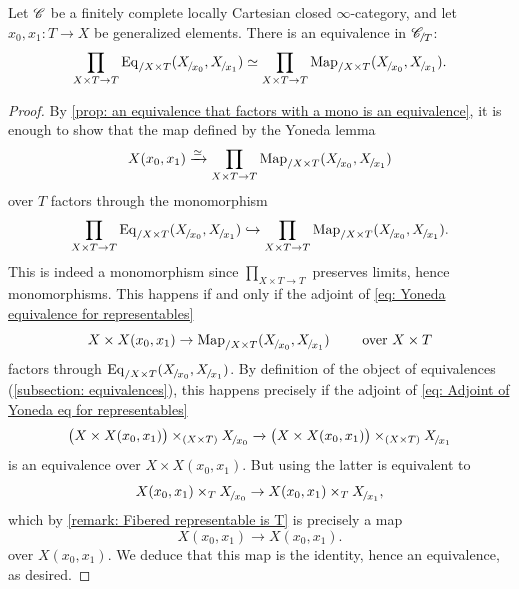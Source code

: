 \documentclass[twoside,a4paper,11pt]{amsart}
\begin{document}
\begin{lemma}\label{lemma: nat trans between representables are nat equivalences}
    Let $\mathscr{C}$ be a finitely complete locally Cartesian closed $\infty$-category, and let $x_0,x_1\colon T\to X$ be generalized elements. There is an equivalence in $\slice{\C}{T}$: \[\prod_{X\times T\to T}\Eq_{/X\times T}(\slice{X}{x_0},\slice{X}{x_1})\simeq \prod_{X\times T\to T}\Map_{/X\times T}(\slice{X}{x_0},\slice{X}{x_1}).\]
\end{lemma}
\begin{proof}
By \cref{prop: an equivalence that factors with a mono is an equivalence}, it is enough to show that the map defined by the Yoneda lemma
\begin{equation}\label{eq: Yoneda equivalence for representables}
X(x_0,x_1)\xrightarrow{\simeq} \prod_{X\times T\to T}\Map_{/X\times T}(\slice{X}{x_0},\slice{X}{x_1})
\end{equation}
over $T$ factors through the monomorphism \[\prod_{X\times T\to T}\Eq_{/X\times T}(\slice{X}{x_0},\slice{X}{x_1})\hookrightarrow \prod_{X\times T\to T}\Map_{/X\times T}(\slice{X}{x_0},\slice{X}{x_1}).\]
This is indeed a monomorphism since $\prod_{X\times T\to T}$ preserves limits, hence monomorphisms.
This happens if and only if the adjoint of \eqref{eq: Yoneda equivalence for representables}
\begin{equation}\label{eq: Adjoint of Yoneda eq for representables}
    X\times X(x_0,x_1)\to \Map_{/X\times T}(\slice{X}{x_0},\slice{X}{x_1})\qquad \text{ over }X\times T
\end{equation}
factors through $\Eq_{/X\times T}(\slice{X}{x_0},\slice{X}{x_1})$. By definition of the object of equivalences (\cref{subsection: equivalences}), this happens precisely if the adjoint of \eqref{eq: Adjoint of Yoneda eq for representables} 
\begin{equation*}
    \big(X\times X(x_0,x_1)\big)\times _{(X\times T)} \slice{X}{x_0}\xrightarrow{}\big(X\times X(x_0,x_1)\big)\times_{(X\times T)}\slice{X}{x_1}
\end{equation*}
is an equivalence over $X\times X(x_0,x_1)$. But using  the latter is equivalent to \begin{equation*}
    X(x_0,x_1)\times _T \slice{X}{x_0}\to X(x_0,x_1)\times _T\slice{X}{x_1},
\end{equation*}
which by \cref{remark: Fibered representable is T} is precisely a map \[X(x_0,x_1)\to X(x_0,x_1).\]
over $X(x_0,x_1)$. We deduce that this map is the identity, hence an equivalence, as desired.
\end{proof}
\end{document}
